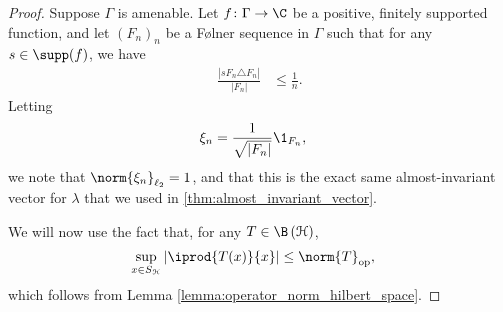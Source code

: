 \begin{proof}
  Suppose $\Gamma$ is amenable. Let $f\colon \Gamma\rightarrow \C$ be a positive, finitely supported function, and let $\left( F_n \right)_n$ be a Følner sequence in $\Gamma$ such that for any $s\in \supp(f)$, we have
  \begin{align*}
    \frac{\left\vert sF_n \triangle F_n\right\vert}{\left\vert F_n \right\vert} &\leq \frac{1}{n}.
  \end{align*}
  Letting
  \begin{align*}
    \xi_n &= \frac{1}{\sqrt{\left\vert F_n \right\vert}}\1_{F_n},
  \end{align*}
  we note that $\norm{\xi_n}_{\ell_2} = 1$, and that this is the exact same almost-invariant vector for $\lambda$ that we used in \ref{thm:almost_invariant_vector}.\newline

  We will now use the fact that, for any $T\in \B\left( \mathcal{H} \right)$,
  \begin{align*}
    \sup_{x\in S_{\mathcal{H}}}\left\vert \iprod{T(x)}{x} \right\vert &\leq \norm{T}_{\op},
  \end{align*}
  which follows from Lemma \ref{lemma:operator_norm_hilbert_space}.\newline


\end{proof}
